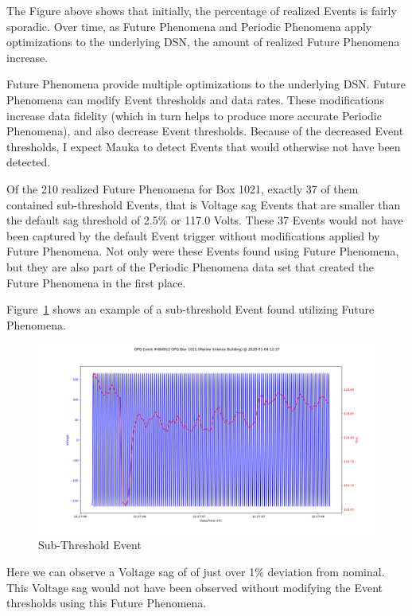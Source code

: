 The Figure above shows that initially, the percentage of realized Events is fairly sporadic. Over time, as Future Phenomena and Periodic Phenomena apply optimizations to the underlying DSN, the amount of realized Future Phenomena increase.

Future Phenomena provide multiple optimizations to the underlying DSN. Future Phenomena can modify Event thresholds and data rates. These modifications increase data fidelity (which in turn helps to produce more accurate Periodic Phenomena), and also decrease Event thresholds. Because of the decreased Event thresholds, I expect Mauka to detect Events that would otherwise not have been detected.

Of the 210 realized Future Phenomena for Box 1021, exactly 37 of them contained sub-threshold Events, that is Voltage sag Events that are smaller than the default sag threshold of 2.5\% or 117.0 Volts. These 37 Events would not have been captured by the default Event trigger without modifications applied by Future Phenomena. Not only were these Events found using Future Phenomena, but they are also part of the Periodic Phenomena data set that created the Future Phenomena in the first place.

Figure~\ref{fig:sub_thresh_event} shows an example of a sub-threshold Event found utilizing Future Phenomena.

\begin{figure}[h]
    \centering
    \includegraphics[width=\linewidth]{figures/event-single-464912.png}
    \caption{Sub-Threshold Event}
    \label{fig:sub_thresh_event}
\end{figure}

Here we can observe a Voltage sag of of just over 1\% deviation from nominal. This Voltage sag would not have been observed without modifying the Event thresholds using this Future Phenomena.

